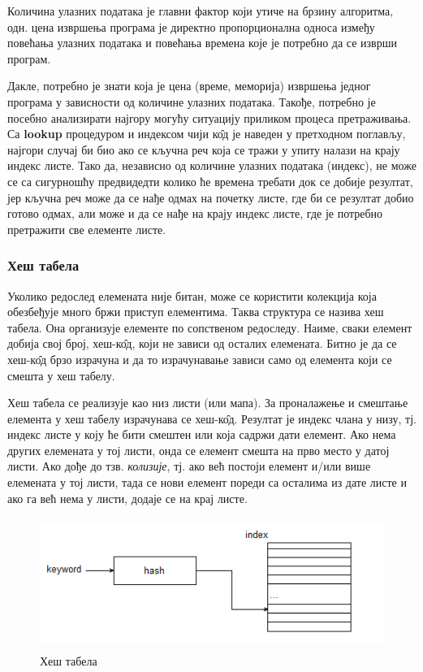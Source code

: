 Количина улазних података је главни фактор који утиче на брзину алгоритма, одн. цена извршења програма је директно пропорционална односа између повећања улазних података и повећања времена које је потребно да се изврши програм.

Дакле, потребно је знати која је цена (време, меморија) извршења једног програма у зависности од количине улазних података. Такође, потребно је посебно анализирати најгору могућу ситуацију приликом процеса претраживања. Са  \textbf{lookup} процедуром и индексом чији к\^{о}д је наведен у претходном поглављу, најгори случај би био ако се кључна реч која се тражи у упиту налази на крају индекс листе. Тако да, независно од количине улазних података (индекс), не може се са сигурношћу предвидедти колико ће времена требати док се добије резултат, јер кључна реч може да се нађе одмах на почетку листе, где би се резултат добио готово одмах, али може и да се нађе на крају индекс листе, где је потребно претражити све елементе листе.

\subsubsection{Хеш табела}

Уколико редослед елемената није битан, може се користити колекција која обезбеђује много бржи приступ елементима. Таква структура се назива хеш табела. Она организује елементе по сопственом редоследу. Наиме, сваки елемент добија свој број, хеш-к\^{о}д, који не зависи од осталих елемената. Битно је да се хеш-к\^{о}д брзо израчуна и да то израчунавање зависи само од елемента који се смешта у хеш табелу.

Хеш табела се реализује као низ листи (или мапа). За проналажење и смештање елемента у хеш табелу израчунава се хеш-к\^{о}д. Резултат је индекс члана у низу, тј. индекс листе у коју ће бити смештен или која садржи дати елемент. Ако нема других елемената у тој листи, онда се елемент смешта на прво место у датој листи. Ако дође до тзв. \emph{колизије}, тј. ако већ постоји елемент и/или више елемената у тој листи, тада се нови елемент пореди са осталима из дате листе и ако га већ нема у листи, додаје се на крај листе.

\begin{figure}[here]
\centering
\includegraphics[height=162px, width=472px]{hashtab1.png}
\caption{Хеш табела}
\label{slike:hash1}
\end{figure}

